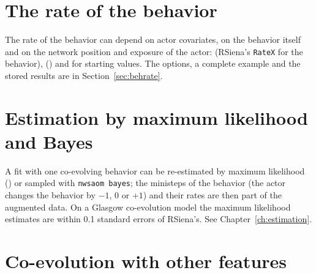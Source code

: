 \section{The rate of the behavior}\label{sec:coev-rate}
The rate of the behavior can depend on actor covariates, on the behavior itself and on the network position and exposure of the actor:  (RSiena's \texttt{RateX} for the behavior),  () and  for starting values. The options, a complete example and the stored results are in Section~\ref{sec:behrate}.

\section{Estimation by maximum likelihood and Bayes}
A fit with one co-evolving behavior can be re-estimated by maximum likelihood () or sampled with \texttt{nwsaom bayes}; the ministeps of the behavior (the actor changes the behavior by $-1$, $0$ or $+1$) and their rates are then part of the augmented data. On a Glasgow co-evolution model the maximum likelihood estimates are within 0.1 standard errors of RSiena's. See Chapter~\ref{ch:estimation}.

\section{Co-evolution with other features}

